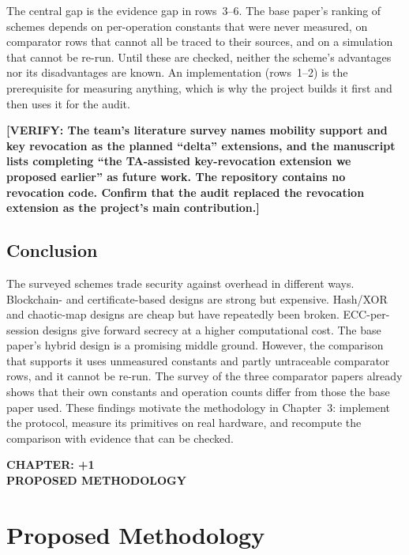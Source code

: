 \documentclass[12pt,a4paper,oneside]{report}
\numberwithin{equation}{chapter}
\newcommand{\ChapterDivider}[1]{%
  \clearpage\thispagestyle{empty}\null\vfill
  \begin{center}{\large\bfseries CHAPTER: \number\numexpr\value{chapter}+1\relax}\\[1.2in]{\large\bfseries\MakeUppercase{#1}}\end{center}
  \vfill\null\clearpage}
\newcommand{\VERIFY}[1]{\textcolor{orange!85!black}{\textbf{[VERIFY: #1]}}}
\begin{document}
The central gap is the evidence gap in rows~3--6. The base paper's ranking of schemes depends on per-operation constants that were never measured, on comparator rows that cannot all be traced to their sources, and on a simulation that cannot be re-run. Until these are checked, neither the scheme's advantages nor its disadvantages are known. An implementation (rows~1--2) is the prerequisite for measuring anything, which is why the project builds it first and then uses it for the audit.

\VERIFY{The team's literature survey names mobility support and key revocation as the planned ``delta'' extensions, and the manuscript lists completing ``the TA-assisted key-revocation extension we proposed earlier'' as future work. The repository contains no revocation code. Confirm that the audit replaced the revocation extension as the project's main contribution.}

\section{Conclusion}
The surveyed schemes trade security against overhead in different ways. Blockchain- and certificate-based designs are strong but expensive. Hash/XOR and chaotic-map designs are cheap but have repeatedly been broken. ECC-per-session designs give forward secrecy at a higher computational cost. The base paper's hybrid design is a promising middle ground. However, the comparison that supports it uses unmeasured constants and partly untraceable comparator rows, and it cannot be re-run. The survey of the three comparator papers already shows that their own constants and operation counts differ from those the base paper used. These findings motivate the methodology in Chapter~3: implement the protocol, measure its primitives on real hardware, and recompute the comparison with evidence that can be checked.

\ChapterDivider{Proposed Methodology}
\chapter{Proposed Methodology}
\end{document}
